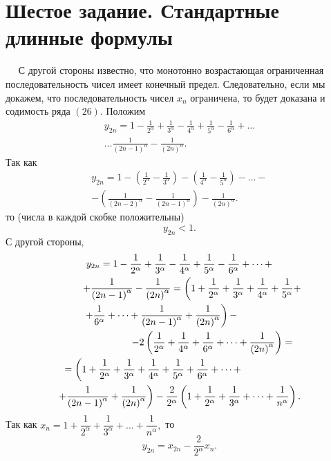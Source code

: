 \documentclass[a4paper,12pt]{article} %
\begin{document}
	\section{Шестое задание. Стандартные длинные формулы}
	$\quad$
	С другой стороны известно, что монотонно возрастающая ограниченная последовательность чисел имеет конечный предел. Следовательно, если мы докажем, что последовательность чисел $x_n$ ограничена, то будет доказана и содимость ряда $\left( 26 \right)$. Положим
	\begin{multline*}
		y_{2n} = 1 - 
		\frac{1}{2^ \alpha} + 
		\frac{1}{3^ \alpha} -
		\frac{1}{4^ \alpha} +
		\frac{1}{5^ \alpha} -
		\frac{1}{6^ \alpha} + 
		\dots \\
		\dots 
		\frac{1}{ \left(2n - 1 \right)^ \alpha} -
		\frac{1}{ \left(2n \right)^ \alpha}.
	\end{multline*}
	Так как
	\begin{multline*}
		y_{2n} = 1 - 
		\left( 
			\frac{1}{2^ \alpha} - 
			\frac{1}{3^ \alpha}
		\right) -
		\left(
			\frac{1}{4^ \alpha} -
			\frac{1}{5^ \alpha} 
		\right) - 
		\dots - \\
		- \left(
			\frac{1}{ \left(2n - 2 \right)^ \alpha} -
			\frac{1}{ \left(2n - 1 \right)^ \alpha} 
		\right) -
		\frac{1}{ \left(2n \right)^ \alpha}.
	\end{multline*}
	то (числа в каждой скобке положительны)
	$$y_{2n} < 1.$$
	С другой стороны,
	\begin{multline*}
		y_{2n} = 1 - 
		\frac{1}{2^ \alpha} + 
		\frac{1}{3^ \alpha} -
		\frac{1}{4^ \alpha} +
		\frac{1}{5^ \alpha} -
		\frac{1}{6^ \alpha} + 
		\dots + \\
		\shoveleft{ \qquad + \frac{1}{ \left(2n - 1 \right)^ \alpha} -
			\frac{1}{ \left(2n \right)^ \alpha} =
			\left(
			1 + 
			\frac{1}{2^ \alpha} + 
			\frac{1}{3^ \alpha} +
			\frac{1}{4^ \alpha} +
			\frac{1}{5^ \alpha} +
			\right.} \\
		\shoveleft{\qquad \left.
			+ \frac{1}{6^ \alpha} +
			\dots +
			\frac{1}{ \left(2n - 1 \right)^ \alpha} +
			\frac{1}{ \left(2n \right)^ \alpha}
			\right) -} \\
		\shoveright{- 2
			\left(
			\frac{1}{2^ \alpha} + 
			\frac{1}{4^ \alpha} +
			\frac{1}{6^ \alpha} +
			\dots +
			\frac{1}{ \left(2n \right)^ \alpha}
			\right) =} \\
		\shoveleft{= \left(
			1 + 
			\frac{1}{2^ \alpha} + 
			\frac{1}{3^ \alpha} +
			\frac{1}{4^ \alpha} +
			\frac{1}{5^ \alpha} +
			\frac{1}{6^ \alpha} +
			\dots + 
			\right.} \\
		\left. + \frac{1}{ \left(2n - 1 \right)^ \alpha} + \frac{1}{ \left(2n \right)^ \alpha} \right) - \frac{2}{2^ \alpha}	\left(1 + \frac{1}{2^ \alpha} + \frac{1}{3^ \alpha} + \dots + \frac{1}{n^ \alpha} \right).
	\end{multline*}
	Так как 
	$x_n = 1 + 
	\dfrac{1}{2^ \alpha} + 
	\dfrac{1}{3^ \alpha} +
	\dots +
	\dfrac{1}{n^ \alpha},$
	то 
	$$y_{2n} = x_{2n} - \dfrac{2}{2^ \alpha} x_n.$$
	
\end{document}
